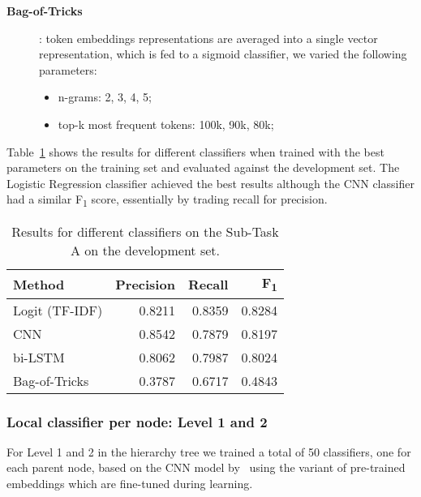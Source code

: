\documentclass[11pt,a4paper]{article}
\begin{document}
\begin{description}
\item[\textbf{Bag-of-Tricks}]: token embeddings representations are averaged into
a single vector representation, which is fed to a sigmoid classifier, we varied
the following parameters:

\begin{itemize}
\item n-grams: 2, 3, 4, 5;
\item top-k most frequent tokens: 100k, 90k, 80k;
\end{itemize}

\end{description}

Table~\ref{subtask_a_devset-results} shows the results for different classifiers
when trained with the best parameters on the training set and evaluated against
the development set. The Logistic Regression classifier achieved the best results
although the CNN classifier  had a similar F\textsubscript{1} score, essentially
by trading recall for precision.

\begin{table}[!h]
\begin{center}
\begin{tabular}{|l|r|r|r|}
\hline\centering\textbf{Method}  & \textbf{Precision} &  \textbf{Recall} &  \textbf{F\textsubscript{1}}\\
\hline
 Logit (TF-IDF) & 0.8211 & 0.8359 & 0.8284 \\
 CNN            & 0.8542 & 0.7879 & 0.8197 \\
 bi-LSTM        & 0.8062 & 0.7987 & 0.8024 \\
 Bag-of-Tricks  & 0.3787 & 0.6717 & 0.4843 \\
\hline
\end{tabular}
\end{center}
\caption{\label{subtask_a_devset-results} Results for different classifiers on the Sub-Task A on the development set.}
\end{table}

\subsubsection{Local classifier per node: Level 1 and 2}

For Level 1 and 2 in the hierarchy tree we trained a total of 50 classifiers, one
for each parent node, based on the CNN model by~\citet{kim-2014-convolutional}
using the variant of pre-trained embeddings which are fine-tuned during learning.
\end{document}
